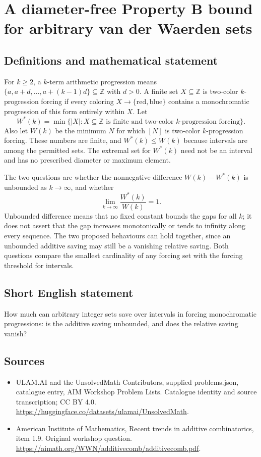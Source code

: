 \documentclass[11pt,a4paper]{article}
\begin{document}
\section*{A diameter-free Property B bound for arbitrary van der Waerden sets}\label{statement}

\subsection{Definitions and mathematical statement}
For $k\ge2$, a $k$-term arithmetic progression means
$\{a,a+d,\ldots,a+(k-1)d\}\subseteq\mathbb Z$ with $d>0$.
A finite set $X\subseteq\mathbb Z$ is two-color $k$-progression
forcing if every coloring $X\to\{\mathrm{red},\mathrm{blue}\}$
contains a monochromatic progression of this form entirely within $X$.
Let
\[
 W^*(k)=\min\{|X|:X\subseteq\mathbb Z\text{ is finite and
                                      two-color }k\text{-progression forcing}\}.
\]
Also let $W(k)$ be the minimum $N$ for which $[N]$ is two-color
$k$-progression forcing. These numbers are finite, and
$W^*(k)\le W(k)$ because intervals are among the permitted sets.
The extremal set for $W^*(k)$ need not be an interval and has no
prescribed diameter or maximum element.

The two questions are whether the nonnegative difference
$W(k)-W^*(k)$ is unbounded as $k\to\infty$, and whether
\[
                         \lim_{k\to\infty}\frac{W^*(k)}{W(k)}=1.
\]
Unbounded difference means that no fixed constant bounds the gaps
for all $k$; it does not assert that the gap increases monotonically
or tends to infinity along every sequence. The two proposed behaviours
can hold together, since an unbounded additive saving may still be
a vanishing relative saving. Both questions compare the smallest
cardinality of any forcing set with the forcing threshold for intervals.
\subsection{Short English statement}
How much can arbitrary integer sets save over intervals in forcing monochromatic progressions: is the additive saving unbounded, and does the relative saving vanish?
\subsection{Sources}
\begin{itemize}
\item[S1] ULAM.AI and the UnsolvedMath Contributors, supplied problems.json, catalogue entry, AIM Workshop Problem Lists. Catalogue identity and source transcription; CC BY 4.0.
\url{https://huggingface.co/datasets/ulamai/UnsolvedMath}.
\item[S2] American Institute of Mathematics, Recent trends in additive combinatorics, item 1.9. Original workshop question.
\url{https://aimath.org/WWN/additivecomb/additivecomb.pdf}.
\end{itemize}
\end{document}

